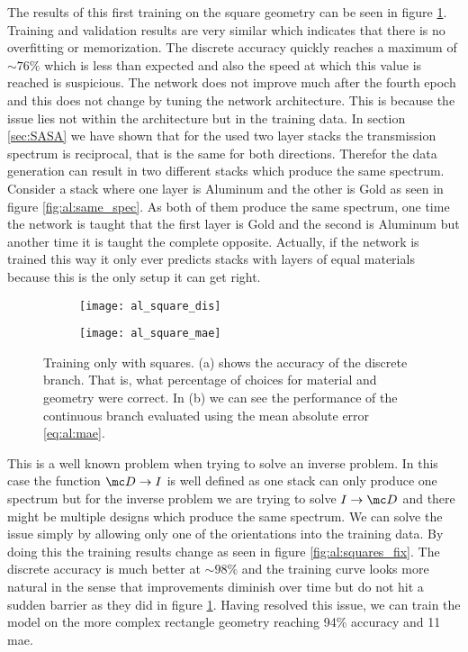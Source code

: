 \indent
The results of this first training on the square geometry can be seen in figure \ref{fig:al:square_results}.
Training and validation results are very similar which indicates that there is no overfitting or memorization. The discrete accuracy quickly reaches a maximum of $\sim 76\%$ which is less than expected and also the speed at which this value is reached is suspicious. The network does not improve much after the fourth epoch and this does not change by tuning the network architecture. This is because the issue lies not within the architecture but in the training data. In section \ref{sec:SASA} we have shown that for the used two layer stacks the transmission spectrum is reciprocal, that is the same for both directions. Therefor the data generation can result in two different stacks which produce the same spectrum. Consider a stack where one layer is Aluminum and the other is Gold as seen in figure \ref{fig:al:same_spec}. As both of them produce the same spectrum, one time the network is taught that the first layer is Gold and the second is Aluminum but another time it is taught the complete opposite. Actually, if the network is trained this way it only ever predicts stacks with layers of equal materials because this is the only setup it can get right.
\begin{figure}[H]
    \centering
    \captionsetup[subfigure]{position=b}
    \begin{subfigure}{.5\textwidth}
        \centering
        \texttt{[image: al\_square\_dis]}
        \caption{}
    \end{subfigure}%
    \begin{subfigure}{.5\textwidth}
        \centering
        \texttt{[image: al\_square\_mae]}
        \caption{}
    \end{subfigure}
    
    \caption{Training only with squares. (a) shows the accuracy of the discrete branch. That is, what percentage of choices for material and geometry were correct. In (b) we can see the performance of the continuous branch evaluated using the mean absolute error \ref{eq:al:mae}.}
    \label{fig:al:square_results}
    \end{figure}



\newpage
This is a well known problem when trying to solve an inverse problem.
In this case the function $\mc D \rightarrow I$ is well defined as one stack can only produce one spectrum but for the inverse problem we are trying to solve $I \rightarrow \mc D$ and there might be multiple designs which produce the same spectrum. We can solve the issue simply by allowing only one of the orientations into the training data. By doing this the training  results change as seen in figure \ref{fig:al:squares_fix}.
The discrete accuracy is much better at $\sim 98 \%$ and the training curve looks more natural in the sense that improvements diminish over time but do not hit a sudden barrier as they did in figure \ref{fig:al:square_results}.
Having resolved this issue, we can train the model on the more complex rectangle geometry reaching 94\% accuracy and 11 mae.

